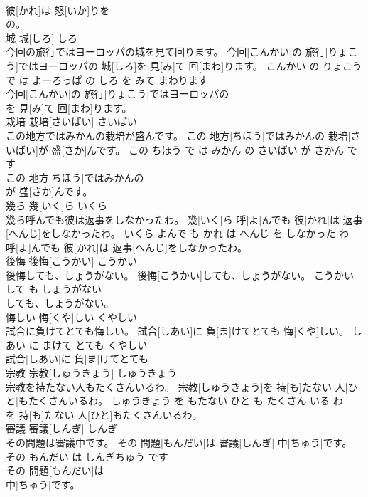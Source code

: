 \documentclass[8pt]{extreport}
\begin{document}
\begin{CJK}{UTF8}{min}
\\	彼[かれ]は 怒[いか]りを
\\	の。			
\\	城	城[しろ]	しろ	
\\	今回の旅行ではヨーロッパの城を見て回ります。	今回[こんかい]の 旅行[りょこう]ではヨーロッパの 城[しろ]を 見[み]て 回[まわ]ります。	こんかい の りょこう で は よーろっぱ の しろ を みて まわります	
\\	今回[こんかい]の 旅行[りょこう]ではヨーロッパの
\\	を 見[み]て 回[まわ]ります。			
\\	栽培	栽培[さいばい]	さいばい	
\\	この地方ではみかんの栽培が盛んです。	この 地方[ちほう]ではみかんの 栽培[さいばい]が 盛[さか]んです。	この ちほう で は みかん の さいばい が さかん です	
\\	この 地方[ちほう]ではみかんの
\\	が 盛[さか]んです。			
\\	幾ら	幾[いく]ら	いくら	
\\	幾ら呼んでも彼は返事をしなかったわ。	幾[いく]ら 呼[よ]んでも 彼[かれ]は 返事[へんじ]をしなかったわ。	いくら よんで も かれ は へんじ を しなかった わ	
\\	呼[よ]んでも 彼[かれ]は 返事[へんじ]をしなかったわ。			
\\	後悔	後悔[こうかい]	こうかい	
\\	後悔しても、しょうがない。	後悔[こうかい]しても、しょうがない。	こうかい して も しょうがない	
\\	しても、しょうがない。			
\\	悔しい	悔[くや]しい	くやしい	
\\	試合に負けてとても悔しい。	試合[しあい]に 負[ま]けてとても 悔[くや]しい。	しあい に まけて とても くやしい	
\\	試合[しあい]に 負[ま]けてとても
\\	宗教	宗教[しゅうきょう]	しゅうきょう	
\\	宗教を持たない人もたくさんいるわ。	宗教[しゅうきょう]を 持[も]たない 人[ひと]もたくさんいるわ。	しゅうきょう を もたない ひと も たくさん いる わ	
\\	を 持[も]たない 人[ひと]もたくさんいるわ。			
\\	審議	審議[しんぎ]	しんぎ	
\\	その問題は審議中です。	その 問題[もんだい]は 審議[しんぎ] 中[ちゅう]です。	その もんだい は しんぎちゅう です	
\\	その 問題[もんだい]は
\\	中[ちゅう]です。			

\end{CJK}
\end{document}

